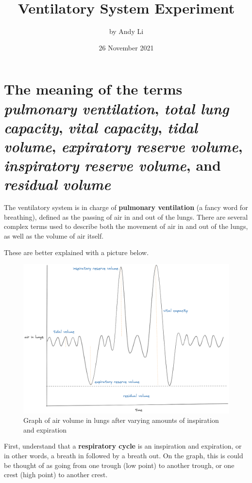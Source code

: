 \documentclass[index]{subfiles}
\begin{document}
\title{Ventilatory System Experiment}
\author{by Andy Li}
\date{26 November 2021}
\maketitle

\section{The meaning of the terms \textit{pulmonary ventilation}, \textit{total lung capacity}, \textit{vital capacity}, \textit{tidal volume}, \textit{expiratory reserve volume}, \textit{inspiratory reserve volume}, and \textit{residual volume}}

The ventilatory system is in charge of \textbf{pulmonary ventilation} (a fancy word for breathing), defined as the passing of air in and out of the lungs. There are several complex terms used to describe both the movement of air in and out of the lungs, as well as the volume of air itself.

These are better explained with a picture below.

\begin{figure}[H]
    \centering
    \includegraphics[scale=0.3]{respiratory_cycle.png}
    \caption{Graph of air volume in lungs after varying amounts of inspiration and expiration}
\end{figure}

First, understand that a \textbf{respiratory cycle} is an inspiration and expiration, or in other words, a breath in followed by a breath out. On the graph, this is could be thought of as going from one trough (low point) to another trough, or one crest (high point) to another crest.
\end{document}

